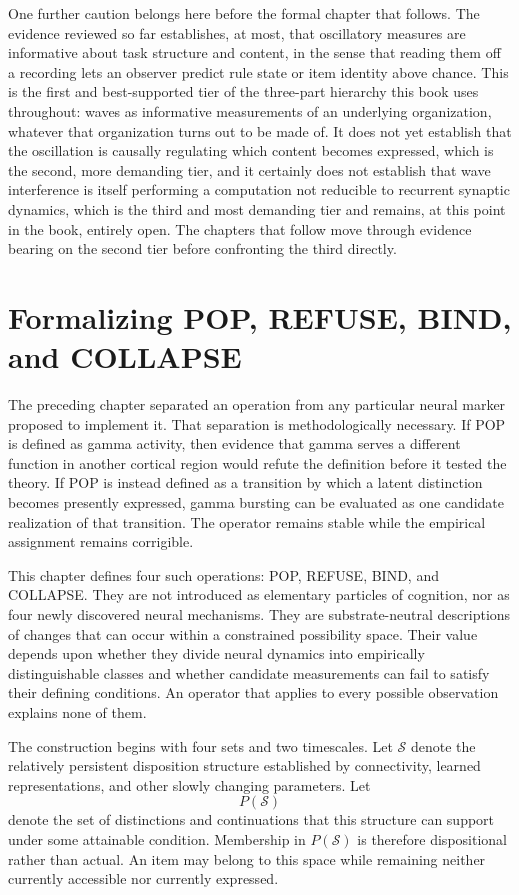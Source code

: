\documentclass[11pt]{book}
\begin{document}
One further caution belongs here before the formal chapter that follows. The evidence reviewed so far establishes, at most, that oscillatory measures are informative about task structure and content, in the sense that reading them off a recording lets an observer predict rule state or item identity above chance. This is the first and best-supported tier of the three-part hierarchy this book uses throughout: waves as informative measurements of an underlying organization, whatever that organization turns out to be made of. It does not yet establish that the oscillation is causally regulating which content becomes expressed, which is the second, more demanding tier, and it certainly does not establish that wave interference is itself performing a computation not reducible to recurrent synaptic dynamics, which is the third and most demanding tier and remains, at this point in the book, entirely open. The chapters that follow move through evidence bearing on the second tier before confronting the third directly.

\chapter{Formalizing POP, REFUSE, BIND, and COLLAPSE}

The preceding chapter separated an operation from any particular neural marker proposed to implement it. That separation is methodologically necessary. If POP is defined as gamma activity, then evidence that gamma serves a different function in another cortical region would refute the definition before it tested the theory. If POP is instead defined as a transition by which a latent distinction becomes presently expressed, gamma bursting can be evaluated as one candidate realization of that transition. The operator remains stable while the empirical assignment remains corrigible.

This chapter defines four such operations: POP, REFUSE, BIND, and COLLAPSE. They are not introduced as elementary particles of cognition, nor as four newly discovered neural mechanisms. They are substrate-neutral descriptions of changes that can occur within a constrained possibility space. Their value depends upon whether they divide neural dynamics into empirically distinguishable classes and whether candidate measurements can fail to satisfy their defining conditions. An operator that applies to every possible observation explains none of them.

The construction begins with four sets and two timescales. Let $\mathcal S$ denote the relatively persistent disposition structure established by connectivity, learned representations, and other slowly changing parameters. Let
\[
P(\mathcal S)
\]
denote the set of distinctions and continuations that this structure can support under some attainable condition. Membership in $P(\mathcal S)$ is therefore dispositional rather than actual. An item may belong to this space while remaining neither currently accessible nor currently expressed.
\end{document}
